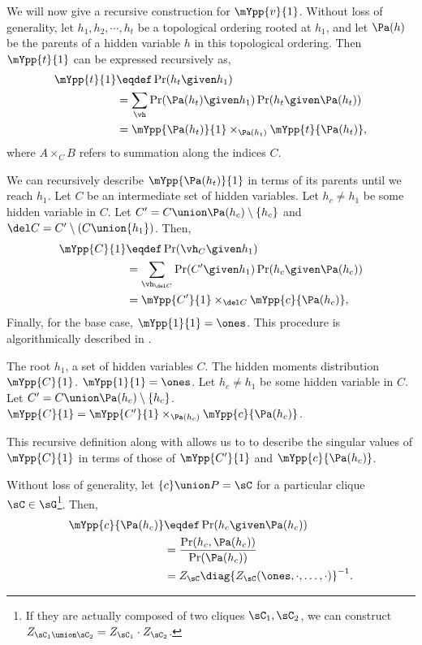 We will now give a recursive construction for $\mYpp{v}{1}$.
Without loss of generality, let $h_1, h_2, \cdots, h_t$ be a topological
  ordering rooted at $h_1$,
and let $\Pa(h)$ be the parents of a hidden variable $h$ in
  this topological ordering.
Then $\mYpp{t}{1}$ can be expressed recursively as,
\begin{align*}
  \mYpp{t}{1} &\eqdef \Pr( h_t \given h_1 )  \\
  &= \sum_{\vh} \Pr( \Pa(h_t) \given h_1 ) \Pr( h_t \given \Pa(h_t) ) \\
  &= \mYpp{ \Pa(h_t) }{1} \times_{\Pa(h_t)} \mYpp{t}{\Pa(h_t)},
\end{align*}
where $A \times_{C} B$ refers to summation along the indices $C$.

We can recursively describe $\mYpp{ \Pa(h_t) }{1}$ in terms of its
  parents until we reach $h_1$.
Let $C$ be an intermediate set of hidden variables. Let $h_c \neq h_1$
  be some hidden variable in $C$. 
Let $C' = C \union \Pa(h_c) \setminus \{h_c\}$ and $\del C = C'
  \setminus (C \union \{h_1\})$.
Then,
\begin{align*}
  \mYpp{C}{1} &\eqdef \Pr( \vh_C \given h_1 )  \\
  &= \sum_{\vh_{\del C}} \Pr( C' \given h_1 ) \Pr( h_c \given \Pa(h_c) ) \\
  &= \mYpp{ C' }{ 1 } \times_{\del C} \mYpp{c}{\Pa(h_c)},
\end{align*}
Finally, for the base case, $\mYpp{1}{1} = \ones$.
This procedure is algorithmically described in .

\begin{algorithm}
  \caption{$\mYpp{C}{1}$}
  \label{algo:Y}
  \begin{algorithmic}
    \REQUIRE The root $h_1$, a set of hidden variables $C$.
    \ENSURE The hidden moments distribution $\mYpp{C}{1}$.
      \STATE $\mYpp{1}{1} = \ones$.
    \ELSE
      \STATE Let $h_c \neq h_1$ be some hidden variable in $C$.
      \STATE Let $C' = C \union \Pa(h_c) \setminus \{h_c\}$.
      \STATE $\mYpp{C}{1} = \mYpp{C'}{1} \times_{\Pa(h_c)} \mYpp{c}{\Pa(h_c)}$.
    \ENDIF
  \end{algorithmic}
\end{algorithm}

This recursive definition along with  allows us to to describe the
singular values of $\mYpp{C}{1}$ in terms of those of $\mYpp{C'}{1}$ and
$\mYpp{c}{\Pa(h_c)}$. 


Without loss of generality, let $\{c\} \union P = \sC$ for
a particular clique $\sC \in \sG$\footnote{If they are actually composed of two
cliques $\sC_1, \sC_2$, we can construct $Z_{\sC_1 \union \sC_2} = Z_{\sC_1} \cdot
Z_{\sC_2}$.}. Then, 
\begin{align*}
\mYpp{c}{\Pa(h_c)} 
  &\eqdef \Pr(h_c \given \Pa(h_c)) \\
  &= \frac{\Pr(h_c, \Pa(h_c))}{\Pr(\Pa(h_c))} \\
  &= Z_\sC \diag{Z_\sC(\ones, \cdot, \ldots, \cdot)}^{-1}.
\end{align*}

